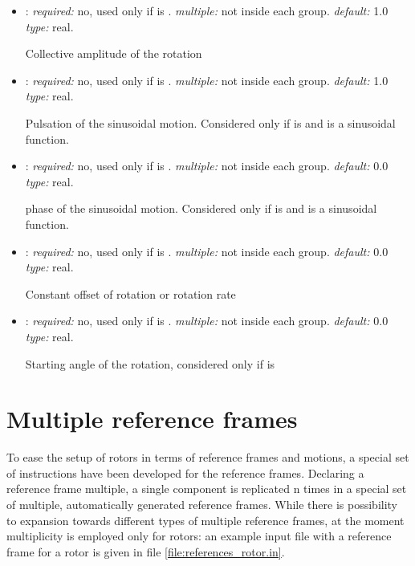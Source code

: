 \begin{itemize}
\begin{itemize}
    \item {}: \textit{required:} no, used only if  
    is . \textit{multiple:} not inside each  group. 
    \textit{default:} 1.0 \textit{type:} real.
    
    Collective amplitude of the rotation 
    
    \item {}: \textit{required:} no, used only if  
    is . \textit{multiple:} not inside each  group. 
    \textit{default:} 1.0 \textit{type:} real.
    
    Pulsation of the sinusoidal motion. Considered only if  is 
     and  is a sinusoidal function.
    
        \item {}: \textit{required:} no, used only if 
         is . \textit{multiple:} not 
        inside each  group. \textit{default:} 0.0 \textit{type:} real.
    
    phase of the sinusoidal motion. Considered only if  is 
     and  is a sinusoidal function.
    
    \item {}: \textit{required:} no, used only if  
    is . \textit{multiple:} not inside each  group. 
    \textit{default:} 0.0 \textit{type:} real.
    
    Constant offset of rotation or rotation rate
    
    \item {}: \textit{required:} no, used only if  
    is . \textit{multiple:} not inside each  group. 
    \textit{default:} 0.0 \textit{type:} real.
    
    Starting angle of the rotation, considered only if  is 
    
	\end{itemize}

\end{itemize}



\section{Multiple reference frames}
To ease the setup of rotors in terms of reference frames and motions, 
a special set of instructions have been developed for the reference frames. 
Declaring a reference frame multiple, a single component is replicated n times 
in a special set of multiple, automatically generated reference frames. 
While there is possibility to expansion towards different types of multiple 
reference frames, at the moment multiplicity is employed only for rotors: an 
example input file with a reference frame for a rotor is given in file 
\ref{file:references_rotor.in}. 

